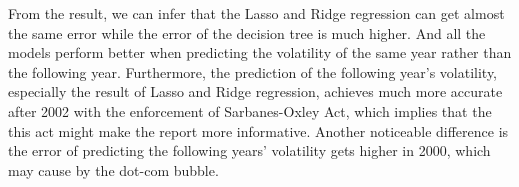 \documentclass[11pt]{article}
\begin{document}

From the result, we can infer that the Lasso and Ridge regression can get almost the same error while the error of the decision tree is much higher. And all the models perform better when predicting the volatility of the same year rather than the following year. Furthermore, the prediction of the following year's volatility, especially the result of Lasso and Ridge regression, achieves much more accurate after 2002 with the enforcement of Sarbanes-Oxley Act, which implies that the this act might make the report more informative. Another noticeable difference is the error of predicting the following years' volatility gets higher in 2000, which may cause by the dot-com bubble.
\end{document}
